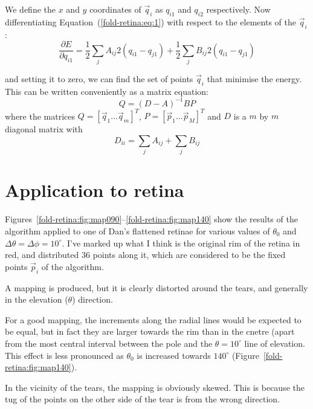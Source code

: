 \documentclass{article}
\begin{document}
We define the $x$ and $y$ coordinates of $\vec{q}_i$ as $q_{i1}$ and
$q_{i2}$ respectively. Now
 differentiating Equation~(\ref{fold-retina:eq:1}) with respect to
the elements of the $\vec{q}_i$:
\begin{equation}
  \label{fold-retina:eq:5}
  \frac{\partial E}{\partial q_{i1}} = 
  \frac{1}{2}\sum_j A_{ij} 2(q_{i1} - q_{j1}) 
  +   \frac{1}{2}\sum_j B_{ij} 2(q_{i1} - q_{j1}) 
\end{equation}

and setting it to zero, we can find
the set of points $\vec{q}_i$ that minimise the energy. This can be
written conveniently as a matrix equation:
\begin{equation}
  \label{fold-retina:eq:3}
  Q = (D - A)^{-1}BP
\end{equation}
where the matrices $Q=[ \vec{q}_1 \dots \vec{q}_m]^T$, $P=[ \vec{p}_1
\dots \vec{p}_M]^T$ and $D$ is a $m$ by $m$  diagonal matrix with
\begin{equation}
  \label{fold-retina:eq:4}
  D_{ii} = \sum_j A_{ij} + \sum_j B_{ij}
\end{equation}

\section{Application to retina}
\label{fold-retina:sec:application-retina}

Figures~\ref{fold-retina:fig:map090}--\ref{fold-retina:fig:map140}
show the results of the algorithm applied to one of Dan's flattened
retinae for various values of $\theta_0$ and $\Delta\theta=\Delta\phi=10^\circ$. I've marked up what I think is the original rim of the retina
in red, and distributed 36 points along it, which are considered to be
the fixed points $\vec{p}_i$ of the algorithm.

A mapping is produced, but it is clearly distorted around the tears,
and generally in the elevation ($\theta$) direction.

For a good mapping, the increments along the radial lines would be
expected to be equal, but in fact they are larger towards the rim than
in the cnetre (apart from the most central interval between the pole
and the $\theta=10^\circ$ line of elevation. This effect is less
pronounced as $\theta_0$ is increased towards $140^\circ$
(Figure~\ref{fold-retina:fig:map140}).

In the vicinity of the tears, the mapping is obviously skewed. This is
because the tug of the points on the other side of the tear is from
the wrong direction.
\end{document}

